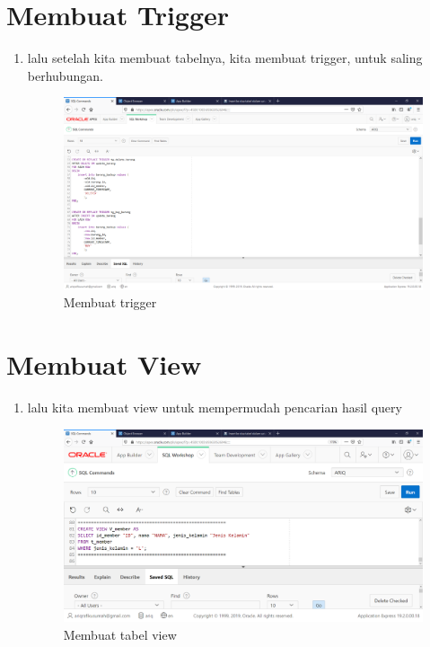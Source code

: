 \documentclass[12pt, a4paper]{report}
\begin{document}
\newpage

\section{Membuat Trigger}
\begin{enumerate}
	\item lalu setelah kita membuat tabelnya, kita membuat trigger, untuk saling berhubungan.
	\begin{figure}[h]
		\centering
			\includegraphics[scale=0.3]{figures/TR.PNG}
		\caption{Membuat trigger}
	\end{figure}
\end{enumerate}


\section{Membuat View}

\begin{enumerate}
	\item lalu kita membuat view untuk mempermudah pencarian hasil query
	\begin{figure}[h]
		\centering
			\includegraphics[scale=0.3]{figures/V.PNG}
		\caption{Membuat tabel view}
	\end{figure}
\end{enumerate}
\end{document}
